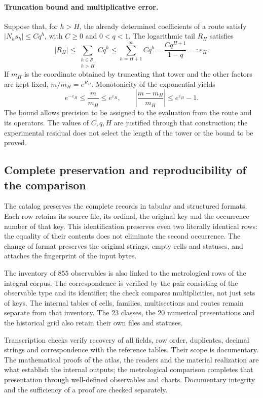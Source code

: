 \paragraph{Truncation bound and multiplicative error.}
Suppose that, for \(h>H\), the already determined coefficients of a
route satisfy \(|N_hs_h|\leq Cq^h\), with \(C\geq0\) and
\(0<q<1\). The logarithmic tail \(R_H\) satisfies
\[
 |R_H|\leq\sum_{\substack{h\in\mathcal S\\h>H}}Cq^h
 \leq\sum_{h=H+1}^{\infty}Cq^h
 =\frac{Cq^{H+1}}{1-q}=:\varepsilon_H.
\]
If \(m_H\) is the coordinate obtained by truncating that tower and the other
factors are kept fixed, \(m/m_H=e^{R_H}\). Monotonicity of the
exponential yields
\[
 e^{-\varepsilon_H}\leq\frac{m}{m_H}\leq e^{\varepsilon_H},
 \qquad
 \left|\frac{m-m_H}{m_H}\right|\leq e^{\varepsilon_H}-1.
\]
The bound allows precision to be assigned to the evaluation from the route and its
operators. The values of \(C,q,H\) are justified through that
construction; the experimental residual does not select the length of the
tower or the bound to be proved.

\subsection{Complete preservation and reproducibility of the comparison}
\label{vi:subsec:vi-catalogo-reproducible}

The catalog preserves the complete records in tabular and
structured formats. Each row retains its source file, its ordinal,
the original key and the occurrence number of that key. This
identification preserves even two literally identical rows: the
equality of their contents does not eliminate the second occurrence. The change
of format preserves the original strings, empty cells and
statuses, and attaches the fingerprint of the input bytes.

The inventory of \(855\) observables is also linked to the metrological
rows of the integral corpus. The correspondence is verified
by the pair consisting of the observable type and its identifier; the
check compares multiplicities, not just sets of keys. The internal
tables of cells, families, multisections and routes remain separate
from that inventory. The \(23\) classes, the \(20\) numerical
presentations and the historical grid also retain their own files and
statuses.

Transcription checks verify recovery of all
fields, row order, duplicates, decimal strings and
correspondence with the reference tables. Their scope is documentary.
The mathematical proofs of the atlas, the readers and the material realization
are what establish the internal outputs; the metrological comparison
completes that presentation through well-defined observables and charts.
Documentary integrity and the sufficiency of a proof are
checked separately.

